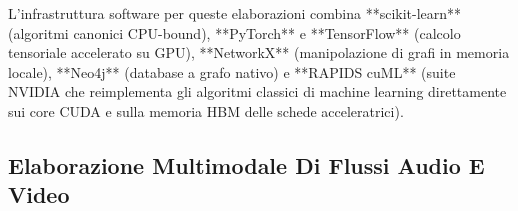 \documentclass[11pt, a4paper]{article}
\begin{document}
L'infrastruttura software per queste elaborazioni combina **scikit-learn** (algoritmi canonici CPU-bound), **PyTorch** e **TensorFlow** (calcolo tensoriale accelerato su GPU), **NetworkX** (manipolazione di grafi in memoria locale), **Neo4j** (database a grafo nativo) e **RAPIDS cuML** (suite NVIDIA che reimplementa gli algoritmi classici di machine learning direttamente sui core CUDA e sulla memoria HBM delle schede acceleratrici).


\subsection{Elaborazione Multimodale Di Flussi Audio E Video}
\end{document}
